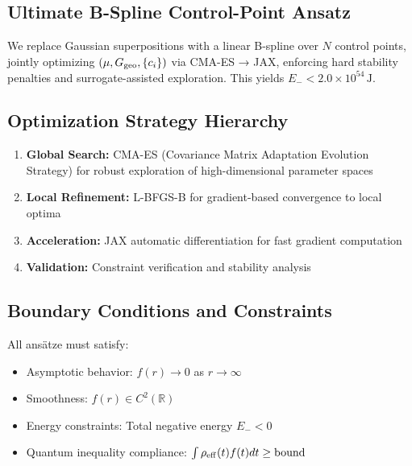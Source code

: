 \documentclass[11pt]{article}
\begin{document}
\subsection*{Ultimate B-Spline Control-Point Ansatz}
We replace Gaussian superpositions with a linear B-spline over \(N\) control points, jointly optimizing \((\mu,G_{\rm geo},\{c_i\})\) via CMA-ES → JAX, enforcing hard stability penalties and surrogate-assisted exploration. This yields \(E_-<2.0\times10^{54}\,\mathrm{J}\).

\subsection*{Optimization Strategy Hierarchy}
\begin{enumerate}
\item \textbf{Global Search:} CMA-ES (Covariance Matrix Adaptation Evolution Strategy) for robust exploration of high-dimensional parameter spaces
\item \textbf{Local Refinement:} L-BFGS-B for gradient-based convergence to local optima
\item \textbf{Acceleration:} JAX automatic differentiation for fast gradient computation
\item \textbf{Validation:} Constraint verification and stability analysis
\end{enumerate}

\subsection*{Boundary Conditions and Constraints}
All ansätze must satisfy:
\begin{itemize}
\item Asymptotic behavior: $f(r) \to 0$ as $r \to \infty$
\item Smoothness: $f(r) \in C^2(\mathbb{R})$
\item Energy constraints: Total negative energy $E_- < 0$
\item Quantum inequality compliance: $\int \rho_{\rm eff}(t)f(t)dt \geq \text{bound}$
\end{itemize}
\end{document}
